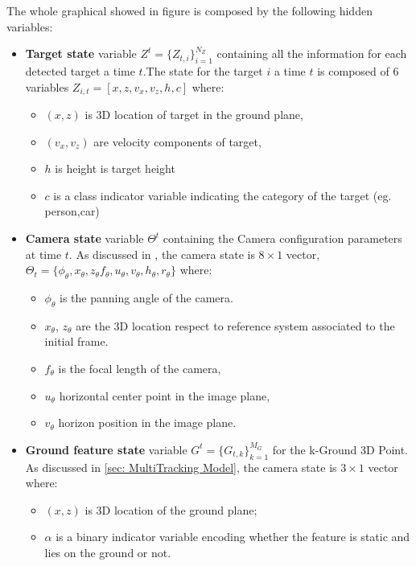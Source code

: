 The whole graphical showed in figure \label{ref: gm_mtt1}  is composed by the following hidden variables:
\begin{itemize}
\item \textbf{Target state} variable $Z^t = \{Z_{t,i} \}_{i=1}^{N_Z}$ containing all the information for each detected target a time $t$.The state for the target $i$ a time $t$ is composed of 6 variables $Z_ {i,t}=[ x,z,v_x,v_z,h,c]$ where:
\begin{itemize}
\item $(x, z)$ is 3D location of target in the ground plane,
\item $(v_x , v_z )$ are velocity components of target,
\item $h$ is height is target height
\item $c$ is a class indicator variable indicating the category of the target (eg. person,car)
\end{itemize}

\item \textbf{Camera state} variable $\Theta^{t}$ containing the Camera configuration parameters at time $t$. As discussed in \label{sec: Multi-Tracking Model}, the camera state is $8\times1$ vector, $\Theta_{t}=\{\phi_{\theta}, x_{\theta}, z_{\theta} f_{\theta}, u_{\theta}, v_{\theta}, h_{\theta},r_{\theta} \}$ where:
\begin{itemize}
\item $\phi_{\theta}$ is the panning angle of the camera.
\item $x_{\theta}$, $z_{\theta}$ are the 3D location respect to reference system associated to the initial frame.
\item $f_{\theta}$ is the focal length of the camera,
\item $u_{\theta}$ horizontal center point in the image plane,
\item $v_{\theta}$ horizon position  in the image plane.
\end{itemize}

\item \textbf{Ground feature state} variable $G^{t} =\{G_{t,k} \}_{k=1}^{M_G}$ for the k-Ground 3D Point. As  discussed in \ref{sec: MultiTracking Model}, the camera state is $3\times1$ vector where:
 \begin{itemize}
\item $(x, z)$ is 3D location of the ground plane;
\item $\alpha$ is a binary indicator variable encoding whether the feature is static and lies on the ground or not.
\end{itemize}
\end{itemize}
